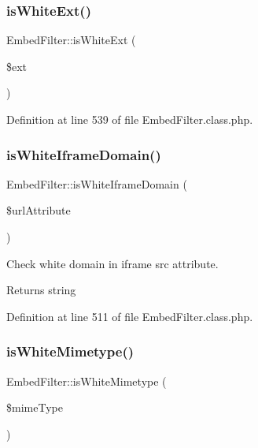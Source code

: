 \hypertarget{classEmbedFilter_ae3cc90883fe1fd15c692ab8268ae15b3}{}\label{classEmbedFilter_ae3cc90883fe1fd15c692ab8268ae15b3} 
\subsubsection{\texorpdfstring{is\+White\+Ext()}{isWhiteExt()}}
{\footnotesize\ttfamily Embed\+Filter\+::is\+White\+Ext (\begin{DoxyParamCaption}\item[{}]{\$ext }\end{DoxyParamCaption})}



Definition at line 539 of file Embed\+Filter.\+class.\+php.

\hypertarget{classEmbedFilter_ada5403255f1d3612afefdc6d35e03d7f}{}\label{classEmbedFilter_ada5403255f1d3612afefdc6d35e03d7f} 
\subsubsection{\texorpdfstring{is\+White\+Iframe\+Domain()}{isWhiteIframeDomain()}}
{\footnotesize\ttfamily Embed\+Filter\+::is\+White\+Iframe\+Domain (\begin{DoxyParamCaption}\item[{}]{\$url\+Attribute }\end{DoxyParamCaption})}

Check white domain in iframe src attribute. \begin{DoxyReturn}{Returns}
string 
\end{DoxyReturn}


Definition at line 511 of file Embed\+Filter.\+class.\+php.

\hypertarget{classEmbedFilter_a34e7259c822a6c346a218bea0976e1cd}{}\label{classEmbedFilter_a34e7259c822a6c346a218bea0976e1cd} 
\subsubsection{\texorpdfstring{is\+White\+Mimetype()}{isWhiteMimetype()}}
{\footnotesize\ttfamily Embed\+Filter\+::is\+White\+Mimetype (\begin{DoxyParamCaption}\item[{}]{\$mime\+Type }\end{DoxyParamCaption})}

